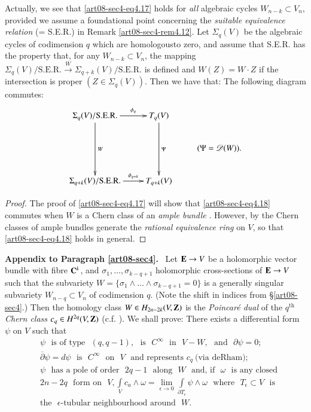 \begin{remark*}
Actually, we see that \eqref{art08-sec4-eq4.17} holds for {\em all} algebraic cycles $W_{n-k}\subset V_{n}$, provided we assume a foundational point concerning the {\em suitable equivalence relation} (= S.E.R.) in Remark \ref{art08-sec4-rem4.12}. Let $\Sigma_{q}(V)$ be the algebraic cycles of codimension $q$ which are homologous\pageoriginale to zero, and assume that S.E.R. has the property that, for any $W_{n-k}\subset V_{n}$, the mapping $\Sigma_{q}(V)/\text{S.E.R.}\xrightarrow{W}\Sigma_{q+k}(V)/\text{S.E.R.}$ is defined and $W(Z)=W\cdot Z$ if the intersection is proper $(Z\in \Sigma_{q}(V))$. Then we have that: The following diagram commutes:
\begin{equation}
\vcenter{\xymatrix{
\Sigma_{q}(V)/\text{S.E.R.}\ar[dd]^-{W}\ar[r]^-{\phi_{q}} & T_{q}(V)\ar[dd]^-{\Psi} &\\
 & & (\Psi=\mathscr{D}(W)).\\
\Sigma_{q+k}(V)/\text{S.E.R.}\ar[r]^-{\phi_{q+k}} & T_{q+k}(V) &
}}\label{art04-sec4-eq4.18}
\end{equation}
\end{remark*}

\begin{proof}
The proof of \eqref{art08-sec4-eq4.17} will show that \eqref{art08-sec4-eq4.18} commutes when $W$ is a Chern class of an {\em ample bundle} \cite{art04-key11}. However, by \cite{art08-key12} the Chern classes of ample bundles generate the {\em rational equivalence ring} on $V$, so that \eqref{art08-sec4-eq4.18} holds in general.
\end{proof}

\medskip
\noindent
{\bf Appendix to Paragraph \ref{art08-sec4}.}~ Let $\mathbf{E}\to V$ be a holomorphic vector bundle with fibre $\mathbf{C}^{k}$, and $\sigma_{1},\ldots,\sigma_{k-q+1}$ holomorphic cross-sections of $\mathbf{E}\to V$ such that the subvariety $W=\{\sigma_{1}\wedge\ldots\wedge \sigma_{k-q+1}=0\}$ is a generally singular subvariety $W_{n-q}\subset V_{n}$ of codimension $q$. (Note the shift in indices from \S\ref{art08-sec4}.) Then the homology class $W\in H_{2n-2k}(V,\mathbf{Z})$ is the {\em Poincar\'e dual} of the $q^{\text{th}}$ {\em Chern class} $c_{q}\in H^{2q}(V,\mathbf{Z})$ (c.f. \cite{art08-key11}). We shall prove: There exists a differential form $\psi$ on $V$ such that
\begin{align*}
& \psi \text{~ is of type~ }(q,q-1), \text{~ is~ } C^{\infty}\text{~ in~ } V-W,\text{~ and~ } \partial \psi=0;\tag{A4.1}\label{art08-sec4-eqA4.1}\\
& \overline{\partial}\psi =d\psi \text{~ is~ } C^{\infty}\text{~ on~ } V\text{~ and represents~} c_{q}~\text{(via deRham)};\tag{A4.2}\label{art08-sec4-eqA4.2}\\
& \psi \text{~ has a pole of order~ } 2q-1\text{~ along~ } W \text{~ and, if~ }\omega \text{~ is any closed}\\
& 2n-2q\text{~ form on~ } V,\int\limits_{V}c_{a}\wedge\omega=\lim\limits_{\epsilon\to 0}\int\limits_{\partial T_{\epsilon}}\psi\wedge \omega\text{~ where~ } T_{\epsilon}\subset V\text{~ is}\\
& \text{the~ }\epsilon\text{-tubular neighbourhood around~ } W.\tag{A4.3}\label{art08-sec4-eqA4.3}
\end{align*}

